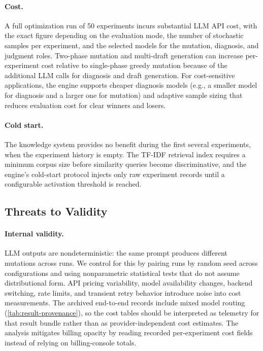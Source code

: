 \paragraph{Cost.}
A full optimization run of 50 experiments incurs substantial LLM API cost, with the exact figure depending on the evaluation mode, the number of stochastic samples per experiment, and the selected models for the mutation, diagnosis, and judgment roles.
Two-phase mutation and multi-draft generation can increase per-experiment cost relative to single-phase greedy mutation because of the additional LLM calls for diagnosis and draft generation.
For cost-sensitive applications, the engine supports cheaper diagnosis models (e.g., a smaller model for diagnosis and a larger one for mutation) and adaptive sample sizing that reduces evaluation cost for clear winners and losers.

\paragraph{Cold start.}
The knowledge system provides no benefit during the first several experiments, when the experiment history is empty.
The TF-IDF retrieval index requires a minimum corpus size before similarity queries become discriminative, and the engine's cold-start protocol injects only raw experiment records until a configurable activation threshold is reached.

\subsection{Threats to Validity}
\label{sec:threats}

\paragraph{Internal validity.}
LLM outputs are nondeterministic: the same prompt produces different mutations across runs.
We control for this by pairing runs by random seed across configurations and using nonparametric statistical tests that do not assume distributional form.
API pricing variability, model availability changes, backend switching, rate limits, and transient retry behavior introduce noise into cost measurements.
The archived end-to-end records include mixed model routing (\cref{tab:result-provenance}), so the cost tables should be interpreted as telemetry for that result bundle rather than as provider-independent cost estimates.
The analysis mitigates billing opacity by reading recorded per-experiment cost fields instead of relying on billing-console totals.

